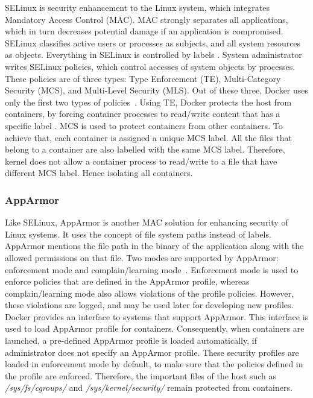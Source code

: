 SELinux is security enhancement to the Linux system, which
integrates Mandatory Access Control (MAC). MAC strongly separates
all applications, which in turn decreases potential damage if an
application is compromised. SELinux classifies active users or
processes as subjects, and all system resources as objects.
Everything in SELinux is controlled by labels
\cite{smalley2001implementing}. System administrator writes
SELinux policies, which control accesses of system objects
by processes. These policies are of three types: Type
Enforcement (TE), Multi-Category Security (MCS), and Multi-Level
Security (MLS). Out of these three, Docker
uses only the first two types of policies~\cite{bui2015analysis}. Using TE,
Docker protects the host from containers,
by forcing container processes to read/write content
that has a specific label \cite{bui2015analysis}.
MCS is used to protect containers from
other containers. To achieve that, each container is
assigned a unique MCS label. All the files that belong to a
container are also labelled with the same MCS label.
Therefore, kernel does not allow a container process to read/write to a file
that have different MCS label. Hence isolating all containers.

\subsubsection{AppArmor}

Like SELinux, AppArmor is another MAC solution
for enhancing security of Linux systems. It uses
the concept of file system paths instead of labels.
AppArmor mentions the file path in the binary of
the application along with the allowed permissions
on that file. Two modes are supported by AppArmor:
enforcement mode and complain/learning mode~\cite{bui2015analysis}.
Enforcement mode is used to enforce policies that are
defined in the AppArmor profile, whereas complain/learning
mode also allows violations of the profile policies.
However, these violations are logged, and may be used later for
developing new profiles. Docker provides an interface to systems
that support AppArmor. This interface is used to load
AppArmor profile for containers. Consequently, when
containers are launched, a pre-defined AppArmor profile is
loaded automatically, if administrator does not specify
an AppArmor profile. These security profiles are loaded in
enforcement mode by default, to make sure that the policies
defined in the profile are enforced. Therefore, the
important files of the host such as \textit{/sys/fs/cgroups/}
and \textit{/sys/kernel/security/} remain protected from
containers.


